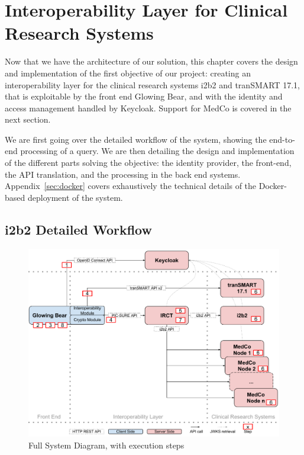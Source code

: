 
\chapter{Interoperability Layer for Clinical Research Systems}
\label{sec:interoplayer}

Now that we have the architecture of our solution, this chapter covers the design and implementation of the first objective of our project: creating an interoperability layer for the clinical research systems i2b2 and tranSMART 17.1, that is exploitable by the front end Glowing Bear, and with the identity and access management handled by Keycloak.
Support for MedCo is covered in the next section.

We are first going over the detailed workflow of the system, showing the end-to-end processing of a query.
We are then detailing the design and implementation of the different parts solving the objective: the identity provider, the front-end, the API translation, and the processing in the back end systems.
Appendix~\ref{sec:docker} covers exhaustively the technical details of the Docker-based deployment of the system.


\section{i2b2 Detailed Workflow}
\label{sec:interoplayer-wf}

\begin{figure}[ht]
    \centering
    \includegraphics[width=1\textwidth]{figures/sys_diagram_full_with_steps.pdf}
    \caption{Full System Diagram, with execution steps}
    \label{fig:sys-diagram-full-steps}
\end{figure}

